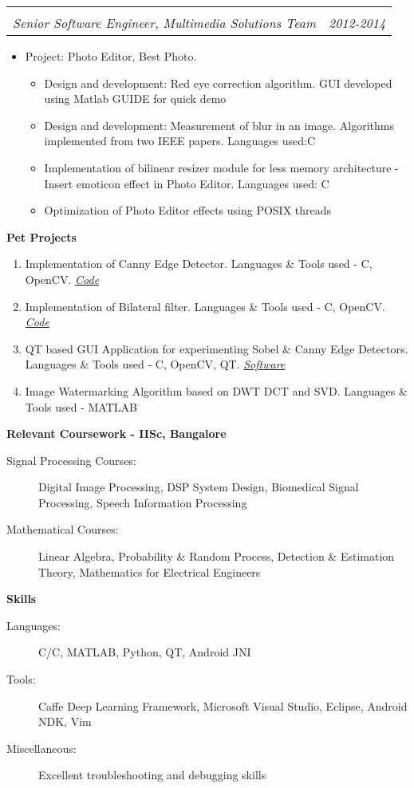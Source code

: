 \documentclass[letterpaper,11pt]{article}
\makeatletter
\def\CC{{C\nolinebreak[4]\hspace{-.05em}\raisebox{.4ex}{\tiny\bf ++}}}
\newcommand{\resitem}[1]{\item #1 \vspace{-2pt}}
\newcommand{\resheading}[1]{{\large \colorbox{mygrey}{\begin{minipage}{\textwidth}{\textbf{#1 \vphantom{p\^{E}}}}\end{minipage}}}}
\newcommand{\ressubheading}[4]{
	\begin{tabular*}{7.0in}{l@{\extracolsep{\fill}}r}
		\textbf{#1} & #2 \\
		\textit{#3} & \textit{#4} \\
	\end{tabular*}\vspace{-6pt}}
\makeatother
\begin{document}
\begin{itemize}
		\ressubheading{}{}{Senior Software Engineer, Multimedia Solutions Team}{2012-2014}
		\begin{itemize}
				\resitem[]{\faCircleO \hspace{1mm}Project: Photo Editor, Best Photo.}
				\begin{itemize}
						\resitem{Design and development: Red eye correction algorithm. GUI developed using Matlab GUIDE for quick demo }
						\resitem{Design and development: Measurement of blur in an image. Algorithms implemented from two IEEE papers. 
							Languages used:\CC}
						\resitem{Implementation of bilinear resizer module for less memory architecture - Insert emoticon effect in Photo Editor. 
							Languages used: C}
						\resitem{Optimization of Photo Editor effects using POSIX threads}
				\end{itemize}
		\end{itemize}

\end{itemize}

\resheading{Pet Projects}
\begin{enumerate}
	\item Implementation of Canny Edge Detector. Languages \& Tools used - \CC, OpenCV.
		\faGithub \hspace{1mm}\href{https://github.com/nrupatunga/Canny-Edge-Detector}{\emph{Code}}
	\item Implementation of Bilateral filter. Languages \& Tools used - \CC, OpenCV.
		\faGithub \hspace{1mm}\href{https://github.com/nrupatunga/Bilateral-Filter}{\emph{Code}}
	\item QT based GUI Application for experimenting Sobel \& Canny Edge Detectors. Languages \& Tools used - \CC, OpenCV, QT. 
		\faWindows \hspace{1mm}\href{https://github.com/nrupatunga/Computer-Vision-Tool}{\emph{Software}}
	\item Image Watermarking Algorithm based on DWT DCT and SVD.  Languages \& Tools used - MATLAB
\end{enumerate}

\resheading{Relevant Coursework - IISc, Bangalore}
\begin{description}
	\item[Signal Processing Courses:]
		Digital Image Processing, DSP System Design, Biomedical Signal Processing, Speech Information Processing
	\item[Mathematical Courses:]
		Linear Algebra, Probability \& Random Process, Detection \& Estimation Theory, Mathematics for Electrical Engineers
\end{description}

\resheading{Skills}
\begin{description}
	\item[Languages:]
		C/\CC, MATLAB, Python, QT, Android JNI
	\item[Tools:]
		Caffe Deep Learning Framework, Microsoft Visual Studio, Eclipse, Android NDK, Vim
	\item[Miscellaneous:]
		Excellent troubleshooting and debugging skills
\end{description}
\end{document}
